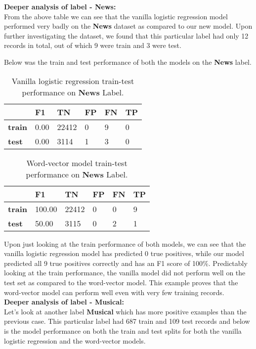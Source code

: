 \newpage
\noindent \textbf{Deeper analysis of label - News:}\\

From the above table we can see that the vanilla logistic regression model performed very badly on the \textbf{News} dataset as compared to our new model. Upon further investigating the dataset, we found that this particular label had only 12 records in total, out of which 9 were train and 3 were test.

Below was the train and test performance of both the models on the \textbf{News} label.

\begin{table}[htbp]
\centering
\begin{tabular}{l|l|l|l|l|l|}
 & \textbf{F1} & \textbf{TN} & \textbf{FP} & \textbf{FN} & \textbf{TP} \\ \hline
\textbf{train} & 0.00 & 22412 & 0 & 9 & 0 \\
\textbf{test} & 0.00 & 3114 & 1 & 3 & 0
\end{tabular}
\caption{\label{tab:widgets}Vanilla logistic regression train-test performance on \textbf{News} Label.}
\end{table}


\begin{table}[htbp]
\centering
\begin{tabular}{l|l|l|l|l|l|}
 & \textbf{F1} & \textbf{TN} & \textbf{FP} & \textbf{FN} & \textbf{TP} \\ \hline
\textbf{train} & 100.00 & 22412 & 0 & 0 & 9 \\
\textbf{test} & 50.00 & 3115 & 0 & 2 & 1
\end{tabular}
\caption{\label{tab:widgets}Word-vector model train-test performance on \textbf{News} Label.}
\end{table}

Upon just looking at the train performance of both models, we can see that the vanilla logistic regression model has predicted 0 true positives, while our model predicted all 9 true positives correctly and has an F1 score of 100\%. Predictably looking at the train performance, the vanilla model did not perform well on the test set as compared to the word-vector model. This example proves that the word-vector model can perform well even with very few training records.\\

\noindent \textbf{Deeper analysis of label - Musical:}\\

Let's look at another label \textbf{Musical} which has more positive examples than the previous case. This particular label had 687 train and 109 test records and below is the model performance on both the train and test splits for both the vanilla logistic regression and the word-vector models.

